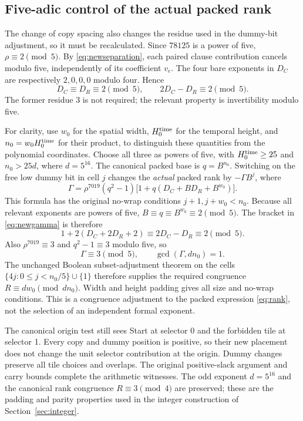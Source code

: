 \subsection{Five-adic control of the actual packed rank}

The change of copy spacing also changes the residue used in the
dummy-bit adjustment, so it must be recalculated.  Since $78125$ is a
power of five, $\rho\equiv2\pmod5$.  By
\eqref{eq:newseparation}, each paired clause contribution cancels
modulo five, independently of its coefficient $v_e$.  The four bare
exponents in $D_C$ are respectively $2,0,0,0$ modulo four.  Hence
\begin{equation}
 D_C\equiv D_R\equiv2\pmod5,
 \qquad 2D_C-D_R\equiv2\pmod5.\label{eq:newunit}
\end{equation}
The former residue 3 is not required; the relevant property is
invertibility modulo five.

For clarity, use $w_0$ for the spatial width, $H_0^{\rm time}$ for the
temporal height, and $n_0=w_0H_0^{\rm time}$ for their product, to
distinguish these quantities from the polynomial coordinates.  Choose
all three as powers of five, with $H_0^{\rm time}\ge25$ and
$n_0>25d$, where $d=5^{16}$.  The canonical packed base is
$q=B^{n_0}$.  Switching on the free low dummy bit in cell $j$ changes
the \emph{actual} packed rank by $-\Gamma B^j$, where
\begin{equation}
 \Gamma=\rho^{7019}(q^2-1)
       \bigl[1+q(D_C+BD_R+B^{w_0})\bigr].\label{eq:newgamma}
\end{equation}
This formula has the original no-wrap conditions $j+1,j+w_0<n_0$.
Because all relevant exponents are powers of five,
$B\equiv q\equiv B^{w_0}\equiv2\pmod5$.  The bracket in
\eqref{eq:newgamma} is therefore
\[
 1+2(D_C+2D_R+2)\equiv2D_C-D_R\equiv2\pmod5.
\]
Also $\rho^{7019}\equiv3$ and $q^2-1\equiv3$ modulo five, so
\begin{equation}
 \Gamma\equiv3\pmod5,\qquad \gcd(\Gamma,dn_0)=1.
 \label{eq:gammatuning}
\end{equation}
The unchanged Boolean subset-adjustment theorem on the cells
$\{4j:0\le j<n_0/5\}\cup\{1\}$ therefore supplies the required
congruence $R\equiv dw_0\pmod{dn_0}$.  Width and height padding gives
all size and no-wrap conditions.  This is a congruence adjustment to
the packed expression \eqref{eq:rank}, not the selection of an
independent formal exponent.

The canonical origin test still sees Start at selector 0 and the
forbidden tile at selector 1.  Every copy and dummy position is
positive, so their new placement does not change the unit selector
contribution at the origin.  Dummy changes preserve all tile choices
and overlaps.  The original positive-slack argument and carry bounds
complete the arithmetic witnesses.  The odd exponent $d=5^{16}$ and
the canonical rank congruence $R\equiv3\pmod4$ are preserved; these
are the padding and parity properties used in the integer construction
of Section~\ref{sec:integer}.

